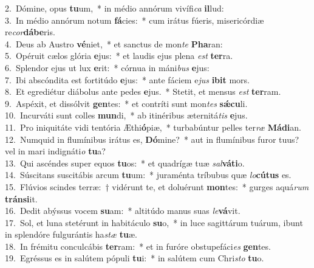{2.~}Dómine, opus \textbf{tu}um,~* in médio annórum vivífi\textit{ca} \textbf{il}lud:\\
{3.~}In médio annórum notum \textbf{fá}cies:~* cum irátus fúeris, misericórdiæ re\textit{cor}\textbf{dá}\textbf{be}ris.\\
{4.~}Deus ab Austro \textbf{vé}niet,~* et sanctus de mon\textit{te} \textbf{Pha}ran:\\
{5.~}Opéruit cælos glória \textbf{e}jus:~* et laudis ejus plena \textit{est} \textbf{ter}ra.\\
{6.~}Splendor ejus ut lux \textbf{e}rit:~* córnua in máni\textit{bus} \textbf{e}jus:\\
{7.~}Ibi abscóndita est fortitúdo \textbf{e}jus:~* ante fáciem e\textit{jus} \textbf{i}\textbf{bit} mors.\\
{8.~}Et egrediétur diábolus ante pedes \textbf{e}jus.~* Stetit, et mensus \textit{est} \textbf{ter}ram.\\
{9.~}Aspéxit, et dissólvit \textbf{gen}tes:~* et contríti sunt mon\textit{tes} \textbf{sǽ}\textbf{cu}li.\\
{10.~}Incurváti sunt colles \textbf{mun}di,~* ab itinéribus æternitá\textit{tis} \textbf{e}jus.\\
{11.~}Pro iniquitáte vidi tentória Æthi\textbf{ó}piæ,~* turbabúntur pelles ter\textit{ræ} \textbf{Má}\textbf{di}an.\\
{12.~}Numquid in flumínibus irátus es, \textbf{Dó}mine?~* aut in flumínibus furor tuus? vel in mari indignáti\textit{o} \textbf{tu}a?\\
{13.~}Qui ascéndes super equos \textbf{tu}os:~* et quadrígæ tuæ \textit{sal}\textbf{vá}\textbf{ti}o.\\
{14.~}Súscitans suscitábis arcum \textbf{tu}um:~* juraménta tríbubus quæ \textit{lo}\textbf{cú}\textbf{tus} es.\\
{15.~}Flúvios scindes terræ:~† vidérunt te, et doluérunt \textbf{mon}tes:~* gurges aquá\textit{rum} \textbf{trán}\textbf{si}it.\\
{16.~}Dedit abýssus vocem \textbf{su}am:~* altitúdo manus suas \textit{le}\textbf{vá}vit.\\
{17.~}Sol, et luna stetérunt in habitáculo \textbf{su}o,~* in luce sagittárum tuárum, ibunt in splendóre fulgurántis ha\textit{stæ} \textbf{tu}æ.\\
{18.~}In frémitu conculcábis \textbf{ter}ram:~* et in furóre obstupefáci\textit{es} \textbf{gen}tes.\\
{19.~}Egréssus es in salútem pópuli \textbf{tu}i:~* in salútem cum Chri\textit{sto} \textbf{tu}o.\\
